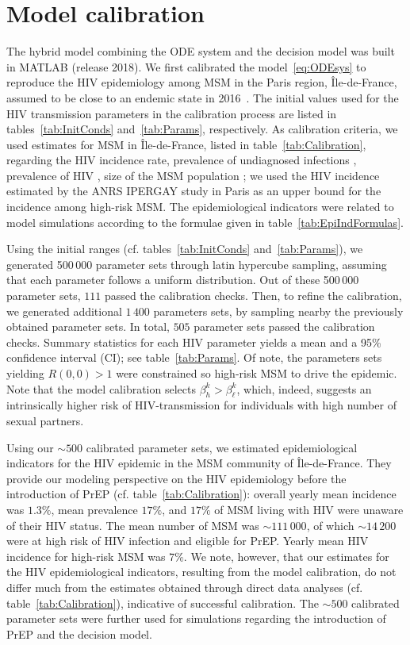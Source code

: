 \documentclass[12pt]{article}
\begin{document}
\newpage
\section{Model calibration} \label{sec:Calibration}

The hybrid model combining the ODE system and the decision model was built in MATLAB (release 2018). We first calibrated the model~\eqref{eq:ODEsys} to reproduce the HIV epidemiology among MSM in the Paris region, \^Ile-de-France, assumed to be close to an endemic state in 2016~\cite{RapportSPF2019}. The initial values used for the HIV transmission parameters in the calibration process are listed in tables~\ref{tab:InitConds} and~\ref{tab:Params}, respectively. As calibration criteria, we used estimates for MSM in \^Ile-de-France, listed in table~\ref{tab:Calibration}, regarding the HIV incidence rate, prevalence of undiagnosed infections \cite{Marty2019}, prevalence of HIV \cite{Prevagay2017}, size of the MSM population \cite{Bajos2018,Insee2015}; we used the HIV incidence estimated by the ANRS IPERGAY study in Paris \cite{Molina2018} as an upper bound for the incidence among high-risk MSM. The epidemiological indicators were related to model simulations according to the formulae given in table~\ref{tab:EpiIndFormulas}. 

Using the initial ranges (cf. tables~\ref{tab:InitConds} and~\ref{tab:Params}), we generated 500\,000 parameter sets through latin hypercube sampling, assuming that each parameter follows a uniform distribution. Out of these 500\,000 parameter sets, $111$ passed the calibration checks. Then, to refine the calibration, we generated additional $1\,400$ parameters sets, by sampling nearby the previously obtained parameter sets. In total, $505$ parameter sets passed the calibration checks. Summary statistics for each HIV parameter yields a mean and a 95\% confidence interval (CI); see table~\ref{tab:Params}.  Of note, {the parameters sets yielding $R(0,0)>1$ were constrained so high-risk MSM to drive the epidemic. Note that the model calibration selects} $\beta^k_h>\beta^k_\ell$, which, indeed, suggests an {intrinsically higher risk of HIV-transmission for individuals with high number of sexual partners}. 

Using our $\sim500$ calibrated parameter sets, we estimated epidemiological indicators for the HIV epidemic in the MSM community of \^Ile-de-France.  They provide our modeling perspective on the HIV epidemiology before the introduction of PrEP (cf. table~\ref{tab:Calibration}): overall yearly mean incidence was $1.3\%$, mean prevalence $17\%$, and $17\%$ of MSM living with HIV were unaware of their HIV status. The mean number of MSM was $\sim111\,000$, of which $\sim14\,200$ were at high risk of HIV infection and eligible for PrEP. Yearly mean HIV incidence for high-risk MSM was $7\%$. We note, however, that our estimates for the HIV epidemiological indicators, resulting from the model calibration, do not differ much from the estimates obtained through direct data analyses (cf. table~\ref{tab:Calibration}), indicative of successful calibration. The $\sim500$ calibrated parameter sets were further used for simulations regarding the introduction of PrEP and the decision model.
\end{document}
